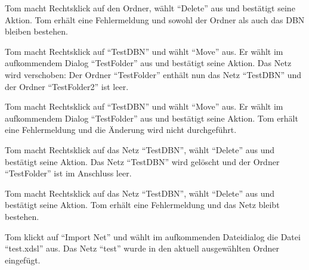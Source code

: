 \documentclass[parskip=full,11pt,twoside]{scrartcl}
\begin{document}
{Tom macht Rechtsklick auf den Ordner, wählt \enquote{Delete} aus und bestätigt seine Aktion.}
{Tom erhält eine Fehlermeldung und sowohl der Ordner als auch das DBN bleiben bestehen.}

{Tom macht Rechtsklick auf \enquote{TestDBN} und wählt \enquote{Move} aus. Er wählt im aufkommendem Dialog \enquote{TestFolder} aus und bestätigt seine Aktion.}
{Das Netz wird verschoben: Der Ordner \enquote{TestFolder} enthält nun das Netz \enquote{TestDBN} und der Ordner \enquote{TestFolder2} ist leer.}

{Tom macht Rechtsklick auf \enquote{TestDBN} und wählt \enquote{Move} aus. Er wählt im aufkommendem Dialog \enquote{TestFolder} aus und bestätigt seine Aktion.}
{Tom erhält eine Fehlermeldung und die Änderung wird nicht durchgeführt.}

{Tom macht Rechtsklick auf das Netz \enquote{TestDBN}, wählt \enquote{Delete} aus und bestätigt seine Aktion.}
{Das Netz \enquote{TestDBN} wird gelöscht und der Ordner \enquote{TestFolder} ist im Anschluss leer.}

{Tom macht Rechtsklick auf das Netz \enquote{TestDBN}, wählt \enquote{Delete} aus und bestätigt seine Aktion.}
{Tom erhält eine Fehlermeldung und das Netz bleibt bestehen.}

{Tom klickt auf \enquote{Import Net} und wählt im aufkommenden Dateidialog die Datei \enquote{test.xdsl} aus.}
{Das Netz \enquote{test} wurde in den aktuell ausgewählten Ordner eingefügt.}
\end{document}
